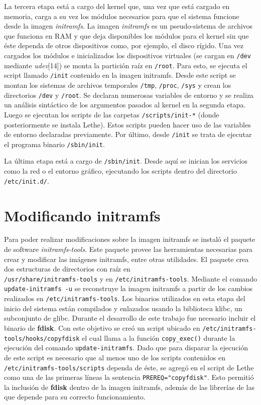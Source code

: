 \documentclass[final,narroweqnarray,inline,twoside]{ieee}
\newcommand{\itref}[1]{[{#1}]}
\begin{document}
La tercera etapa está a cargo del kernel que, una vez que está cargado en memoria, carga a su vez los módulos necesarios para que el sistema funcione desde la imagen \textit{initramfs}. La imagen \textit{initramfs} es un pseudo-sistema de archivos que funciona en RAM y que deja disponibles los módulos para el kernel sin que éste dependa de otros dispositivos como, por ejemplo, el disco rígido.
Una vez cargados los módulos e inicializados los dispositivos virtuales (se cargan en \texttt{/dev} mediante \textit{udev}\itref{14}) se monta la partición raíz en \texttt{/root}. 
Para esto, se ejecuta el script llamado \texttt{/init} contenido en la imagen initramfs. Desde este script se montan los sistemas de archivos temporales \texttt{/tmp}, \texttt{/proc}, \texttt{/sys} y crean los directorios \texttt{/dev} y \texttt{/root}. Se declaran numerosas variables de entorno y se realiza un análisis sintáctico de los argumentos pasados al kernel en la segunda etapa. Luego se ejecutan los scripts de las carpetas \texttt{/scripts/init-*} (donde posteriormente se instala Lethe). Estos scripts pueden hacer uso de las variables de entorno declaradas previamente. Por último, desde \texttt{/init} se trata de ejecutar el programa binario \texttt{/sbin/init}.

La última etapa está a cargo de \texttt{/sbin/init}. Desde aquí se inician los servicios como la red o el entorno gráfico, ejecutando los scripts dentro del directorio \texttt{/etc/init.d/}.

\section{Modificando initramfs}
Para poder realizar modificaciones sobre la imagen initramfs se instaló el paquete de software \textit{initramfs-tools}. Este paquete provee las herramientas necesarias para crear y modificar las imágenes initramfs, entre otras utilidades. El paquete crea dos estructuras de directorios con raíz en\\ \texttt{/usr/share/initramfs-tools} y en \texttt{/etc/initramfs-tools}. Mediante el comando \texttt{update-initramfs -u} se reconstruye la imagen initramfs a partir de los cambios realizados en \texttt{/etc/initramfs-tools}. Los binarios utilizados en esta etapa del inicio del sistema están compilados y enlazados usando la biblioteca klibc, un subconjunto de glibc. Durante el desarrollo de este trabajo fue necesario incluir el binario de \textbf{fdisk}. Con este objetivo se creó un script ubicado en \texttt{/etc/initramfs-tools/hooks/copyfdisk} el cual llama a la función \texttt{copy\_exec()} durante la ejecución del comando \texttt{update-initramfs}. Dado que para disparar la ejecución de este script es necesario que al menos uno de los scripts contenidos en \texttt{/etc/initramfs-tools/scripts} dependa de éste, se agregó en el script de Lethe como una de las primeras líneas la sentencia \texttt{PREREQ="\null copyfdisk"}. Esto permitió la inclusión de \textbf{fdisk} dentro de la imagen initramfs, además de las librerías de las que depende para su correcto funcionamiento.
\end{document}
